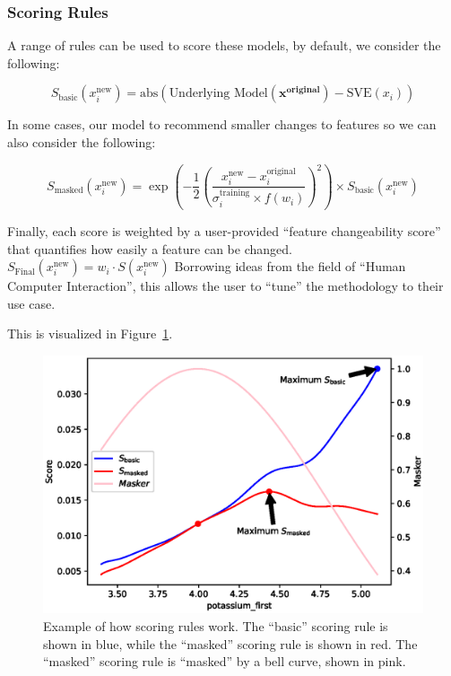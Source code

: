 \documentclass{article}
\begin{document}
\subsubsection{Scoring Rules\label{section:scoring_rules}}
A range of rules can be used to score these models, by default, we consider the following:

\begin{equation}
    S_\text{basic}(x_i^\text{new}) = \text{abs}\left( \text{Underlying Model}\left(\mathbf{x^\text{original}}\right) - \text{SVE}\left(x_i\right) \right) 
    \label{equation:sve_score_basic}
\end{equation}

In some cases, our model to recommend smaller changes to features so we can also consider the following:

\begin{equation}
    S_\text{masked}(x_i^\text{new}) = \exp \left( -\frac{1}{2}\left(\frac{ x_i^\text{new} - x_i^\text{original} }{\sigma^\text{training}_i \times f(w_i)} \right)^2\right) \times S_\text{basic}(x_i^\text{new}) %
    \label{equation:sve_score_masked}
\end{equation}

Finally, each score is weighted by a user-provided ``feature changeability score'' that quantifies how easily a feature can be changed. \(S_{\text{Final}}\left(x_i^{\text{new}}\right) = w_i \cdot S\left(x_i^{\text{new}}\right) \) Borrowing ideas from the field of ``Human Computer Interaction'', this allows the user to ``tune'' the methodology to their use case.

This is visualized in Figure~\ref{figure:scoring_example}.

\begin{figure}[t]
    \centering
    \includegraphics[width=\linewidth]{figures/scoring.eps}
    \caption{Example of how scoring rules work. The ``basic'' scoring rule is shown in blue, while the ``masked'' scoring rule is shown in red. The ``masked'' scoring rule is ``masked'' by a bell curve, shown in pink.\label{figure:scoring_example}}
\end{figure}
\end{document}
